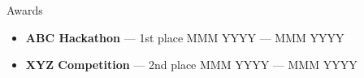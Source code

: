 \begin{rSection}{Awards}

    \begin{itemize}
        \item \textbf{ABC Hackathon} --- 1st place \hfill {MMM YYYY --- MMM YYYY}
        \item \textbf{XYZ Competition} --- 2nd place \hfill {MMM YYYY --- MMM YYYY}
    \end{itemize}

    \end{rSection}

